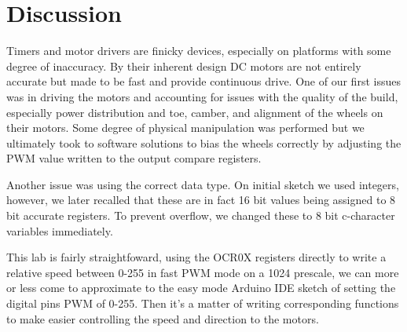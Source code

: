 \documentclass[letterpaper,11pt]{texMemo} %
\begin{document}
\section*{Discussion}
Timers and motor drivers are finicky devices, especially on platforms with 
some degree of inaccuracy. By their inherent design DC motors are not entirely 
accurate but made to be fast and provide continuous drive. One of our first 
issues was in driving the motors and accounting for issues with the quality 
of the build, especially power distribution and toe, camber, and alignment of 
the wheels on their motors. Some degree of physical manipulation was performed 
but we ultimately took to software solutions to bias the wheels correctly by 
adjusting the PWM value written to the output compare registers.

Another issue was using the correct data type. On initial sketch we used integers, 
however, we later recalled that these are in fact 16 bit values being assigned to 
8 bit accurate registers. To prevent overflow, we changed these to 8 bit c-character 
variables immediately.

This lab is fairly straightfoward, using the OCR0X registers directly to write a 
relative speed between 0-255 in fast PWM mode on a 1024 prescale, we can more or 
less come to approximate to the easy mode Arduino IDE sketch of setting the digital 
pins PWM of 0-255. Then it's a matter of writing corresponding functions to 
make easier controlling the speed and direction to the motors.
\end{document}
